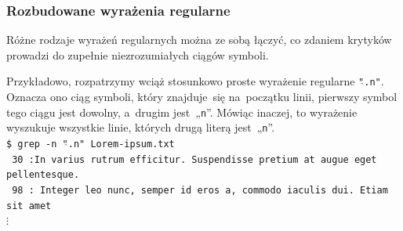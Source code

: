 \documentclass[10pt,t]{beamer}
\begin{document}
\begin{frame}
  \frametitle{Rozbudowane wyrażenia regularne}


  Różne rodzaje wyrażeń regularnych można ze sobą łączyć, co zdaniem
  krytyków prowadzi do zupełnie niezrozumiałych ciągów symboli.

  Przykładowo, rozpatrzymy wciąż stosunkowo proste wyrażenie regularne
  \texttt{"\hspace{0.2em}$\hat{}$\hspace{0.1em}.n"}. Oznacza ono ciąg
  symboli, który znajduje~się na~początku linii, pierwszy symbol tego ciągu
  jest dowolny, a~drugim jest~„\texttt{n}”. Mówiąc inaczej, to wyrażenie
  wyszukuje wszystkie linie, których drugą literą jest~„\texttt{n}”. \\
  \texttt{\$ grep -n "\hspace{0.2em}$\hat{}$\hspace{0.1em}.n"{}
    Lorem-ipsum.txt} \\
  \texttt{{\color{green} 30}{\color{jAxisBlue} :}{\color{red}In} varius
    rutrum efficitur. Suspendisse pretium at augue eget pellentesque.} \\
  \texttt{{\color{green} 98}{\color{jAxisBlue} :}{\color{red} In}teger leo
    nunc, semper id eros a, commodo iaculis dui. Etiam sit amet} \\
  \hspace{1em} $\vdots$

\end{frame}























\end{document}
